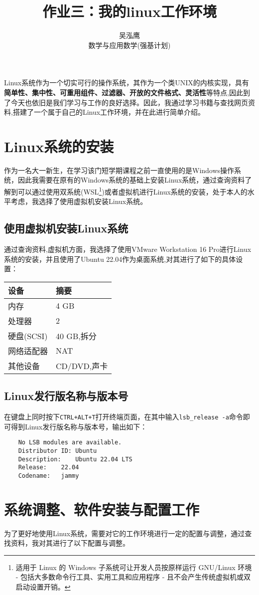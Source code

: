 \documentclass[a4paper]{ctexart}
\title{作业三：我的linux工作环境}
\author{吴泓鹰\\数学与应用数学(强基计划)\qquad 3210101890}
\begin{document}
\maketitle
Linux系统作为一个切实可行的操作系统，其作为一个类UNIX的内核实现，具有{\bf 简单性、集中性、可重用组件、过滤器、开放的文件格式、灵活性}等特点\cite{linux_book},因此到了今天也依旧是我们学习与工作的良好选择。因此，我通过学习书籍与查找网页资料\cite{linux_book}\cite{linux_cainiao},搭建了一个属于自己的Linux工作环境，并在此进行简单介绍。
\section{Linux系统的安装}
作为一名大一新生，在学习该门短学期课程之前一直使用的是Windows操作系统，因此我需要在原有的Windows系统的基础上安装Linux系统，通过查询资料\cite{linux_anz}了解到可以通过使用双系统(WSL\footnote{适用于 Linux 的 Windows 子系统可让开发人员按原样运行 GNU/Linux 环境 - 包括大多数命令行工具、实用工具和应用程序 - 且不会产生传统虚拟机或双启动设置开销。})或者虚拟机进行Linux系统的安装，处于本人的水平考虑，我选择了使用虚拟机安装Linux系统。
\subsection{使用虚拟机安装Linux系统}\label{1.1}
通过查询资料\cite{linux_ubuntu},虚拟机方面，我选择了使用VMware Workstation 16 Pro进行Linux系统的安装，并且使用了Ubuntu 22.04作为桌面系统,对其进行了如下的具体设置：

\begin{tabular}{l|l}
	\hline
	设备 & 摘要\\
	\hline
	内存 & 4 GB \\
	处理器 & 2 \\
	硬盘(SCSI) & 40 GB,拆分 \\
	网络适配器 & NAT \\
	其他设备 & CD/DVD,声卡 \\
	\hline
\end{tabular}
\subsection{Linux发行版名称与版本号}
在键盘上同时按下\verb|CTRL+ALT+T|打开终端页面，在其中输入\verb|lsb_release -a|命令即可得到Linux发行版名称与版本号，输出如下：
\begin{verbatim}
	No LSB modules are available.
	Distributor ID:	Ubuntu
	Description:	Ubuntu 22.04 LTS
	Release:	22.04
	Codename:	jammy
\end{verbatim}
\section{系统调整、软件安装与配置工作}
为了更好地使用Linux系统，需要对它的工作环境进行一定的配置与调整，通过查找资料\cite{linux_ubuntu}\cite{linux_set}，我对其进行了以下配置与调整。
\end{document}
